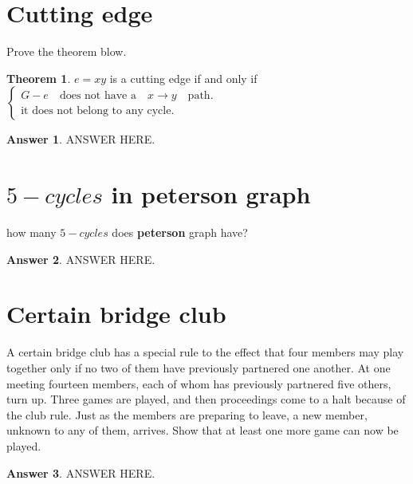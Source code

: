 \documentclass[a4paper]{article}
\renewcommand{\(}{\left(}
\renewcommand{\)}{\right)}
\theoremstyle{plain}
\theoremstyle{plain}
\theoremstyle{definition}
\newtheorem*{answer}{Answer}
\newtheorem{theorem}{Theorem}[section]
\begin{document}
\section{Cutting edge}
Prove the theorem blow.
\begin{theorem}
$e =xy $ is a cutting edge if and only if
 $
\begin{cases}
  G-e \quad \text{does not have a} \quad x \rightarrow y \quad \text{path}. \\
\text{it does not belong to any cycle.}
\end{cases}
$
\end{theorem}
\begin{shaded}
\begin{answer}
ANSWER HERE.
\end{answer}
\end{shaded}

\section{$5-cycles$ in peterson graph}
how many $5-cycles$ does \textbf{peterson} graph have?
\begin{shaded}
\begin{answer}
ANSWER HERE.
\end{answer}
\end{shaded}

\section{Certain bridge club}
A certain bridge club has a special rule to the effect that four members may play together only if no two of them have previously partnered one another. At one meeting fourteen members, each of whom has previously partnered five others, turn up. Three games are played, and then proceedings come to a halt because of the club rule. Just as the members are preparing to leave, a new member, unknown to any of them, arrives. Show that at least one more game can now be played.
\begin{shaded}
\begin{answer}
ANSWER HERE.
\end{answer}
\end{shaded}
\end{document}
